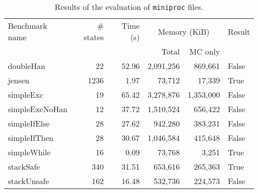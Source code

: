 \documentclass[9pt,a4paper]{article}
\begin{document}
\begin{table}
  \centering
  \begin{tabular}{| l | r | r | r | r | l |}
    \hline
    Benchmark name & \# states & Time (s) & \multicolumn{2}{c|}{Memory (KiB)} & Result \\
    \cline{4-5}
    & & & Total & MC only & \\
    \hline
    doubleHan      &   22 & 52.96 & 2,091,256 &   869,661 & False \\
    jensen         & 1236 &  1.97 &    73,712 &    17,339 & True \\
    simpleExc      &   19 & 65.42 & 3,278,876 & 1,353,000 & False \\
    simpleExcNoHan &   12 & 37.72 & 1,510,524 &   656,422 & False \\
    simpleIfElse   &   28 & 27.62 &   942,280 &   383,231 & False \\
    simpleIfThen   &   28 & 30.67 & 1,046,584 &   415,648 & False \\
    simpleWhile    &   16 &  0.09 &    73,768 &     3,251 & True \\
    stackSafe      &  340 & 31.51 &   653,616 &   265,363 & True \\
    stackUnsafe    &  162 & 16.48 &   532,736 &   224,573 & False \\
    \hline
  \end{tabular}
  \caption{Results of the evaluation of \texttt{miniproc} files.}
  \label{tab:exp-miniproc}
\end{table}
\end{document}
